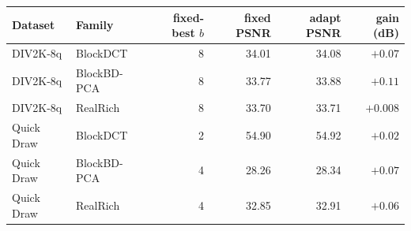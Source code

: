 \begin{tabular}{llrrrr}
\toprule
Dataset & Family & fixed-best $b$ & fixed PSNR & adapt PSNR & gain (dB) \\
\midrule
DIV2K-8q & BlockDCT & 8 & 34.01 & 34.08 & $+0.07$ \\
DIV2K-8q & BlockBD-PCA & 8 & 33.77 & 33.88 & $+0.11$ \\
DIV2K-8q & RealRich & 8 & 33.70 & 33.71 & $+0.008$ \\
\midrule
Quick Draw & BlockDCT & 2 & 54.90 & 54.92 & $+0.02$ \\
Quick Draw & BlockBD-PCA & 4 & 28.26 & 28.34 & $+0.07$ \\
Quick Draw & RealRich & 4 & 32.85 & 32.91 & $+0.06$ \\
\bottomrule
\end{tabular}
